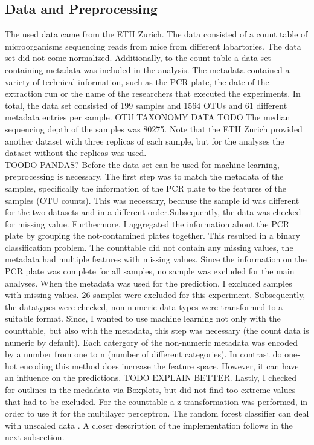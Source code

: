 \documentclass{svproc}
\begin{document}
\subsection{Data and Preprocessing}

The used data came from the ETH Zurich. The data consisted of a count table of microorganisms  sequencing reads from mice from different labartories. The data set did not come normalized. Additionally, to the count table a data set containing metadata was included in the analysis. The metadata contained a variety of technical information, such as the PCR plate, the date of the extraction run or the name of the researchers that executed the experiments. In total, the data set consisted of 199 samples and 1564 OTUs and 61 different metadata entries per sample. OTU TAXONOMY DATA TODO The median sequencing depth of the samples was 80275. Note that the ETH Zurich provided another dataset with three replicas of each sample, but for the analyses the dataset without the replicas was used.\\

TOODO PANDAS?
Before the data set can be used for machine learning, preprocessing is necessary. The first step was to match the metadata of the samples, specifically the information of the PCR plate to the features of the samples (OTU counts). This was necessary, because the sample id was different for the two datasets and in a different order.Subsequently, the data was checked for missing value. Furthermore, I aggregated the information about the PCR plate by grouping the not-contamined plates together. This resulted in a binary classification problem. The counttable did not contain any missing values, the metadata had multiple features with missing values. Since the information on the PCR plate was complete for all samples, no sample was excluded for the main analyses. When the metadata was used for the prediction, I excluded samples with missing values. 26 samples were excluded for this experiment. Subsequently, the datatypes were checked, non numeric data types were transformed to a suitable format. Since, I wanted to use machine learning not only with the counttable, but also with the metadata, this step was necessary (the count data is numeric by default). Each catergory of the non-numeric metadata was encoded by a number from one to n (number of different categories). In contrast do one-hot encoding this method does increase the feature space. However, it can have an influence on the predictions. TODO EXPLAIN BETTER. 
Lastly, I checked for outlines in the medadata via Boxplots, but did not find too extreme values that had to be excluded. For the counttable a z-transformation was performed, in order to use it for the multilayer perceptron. The random forest classifier can deal with unscaled data \cite{TOO RF paper}. A closer description of the implementation follows in the next subsection.
\end{document}
